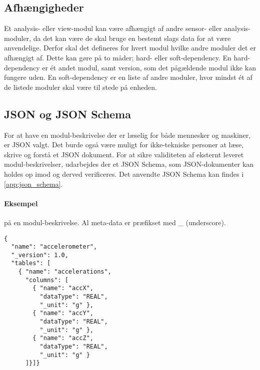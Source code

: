 \subsection{Afhængigheder}
Et analysis- eller view-modul kan være afhængigt af andre sensor- eller analysis-moduler, da det kan være de skal bruge en bestemt slags data for at være anvendelige.
Derfor skal det defineres for hvert modul hvilke andre moduler det er afhængigt af.
Dette kan gøre på to måder; hard- eller soft-dependency.
En hard-dependency er ét andet modul, samt version, som det pågældende modul ikke kan fungere uden.
En soft-dependency er en liste af andre moduler, hvor mindst ét af de listede moduler skal være til stede på enheden.

\subsection{JSON og JSON Schema}
For at have en modul-beskrivelse der er læselig for både mennesker og maskiner, er JSON valgt.
Det burde også være muligt for ikke-tekniske personer at læse, skrive og forstå et JSON dokument.
For at sikre validiteten af eksternt leveret modul-beskrivelser, udarbejdes der et JSON Schema, som JSON-dokumenter kan holdes op imod og derved verificeres.
Det anvendte JSON Schema kan findes i \cref{app:json_schema}.

\paragraph{Eksempel} på en modul-beskrivelse.
Al meta-data er præfikset med \_ (underscore).
\begin{lstlisting}
{
  "name": "accelerometer",
  "_version": 1.0,
  "tables": [
    { "name": "accelerations",
      "columns": [
        { "name": "accX",
          "dataType": "REAL",
          "_unit": "g" },
        { "name": "accY",
          "dataType": "REAL",
          "_unit": "g" },
        { "name": "accZ",
          "dataType": "REAL",
          "_unit": "g" }
      ]}]}
\end{lstlisting}

